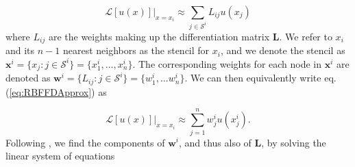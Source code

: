 \documentclass[10pt,a4paper]{article}
\begin{document}
\begin{equation}\label{eq:RBFFDApprox}
\mathcal{L}[u(x)]\big|_{x=x_i} \approx \sum_{j \in \mathcal{S}^i} L_{ij} u(x_j)
\end{equation}
where $L_{ij}$ are the weights making up the differentiation matrix $\mathbf{L}$.  We refer to $x_i$ and its $n-1$ nearest neighbors as the stencil for $x_i$, and we denote the stencil as $\mathbf{x}^i = \{x_j : j \in \mathcal{S}^i\} = \{x^i_1,..., x^i_n\}$. The corresponding weights for each node in $\mathbf{x}^i$ are denoted as $\mathbf{w}^i = \{L_{ij} : j \in \mathcal{S}^i\} = \{w^i_1,...w^i_n\}$.  We can then equivalently write eq. (\ref{eq:RBFFDApprox}) as 

\begin{equation}\label{eq:RBFFDApproxAlt}
\mathcal{L}[u(x)]\big|_{x=x_i} \approx \sum_{j=1}^n w^i_j u(x^i_j).
\end{equation}
Following \citet{Fornberg2015}, we find the components of $\mathbf{w}^i$, and thus also of $\mathbf{L}$, by solving the linear system of equations
\end{document}
